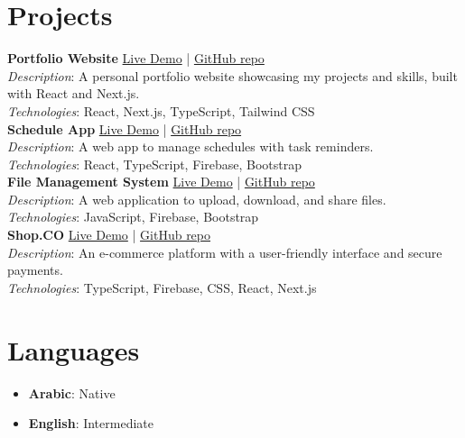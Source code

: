 \documentclass[a4paper,12pt]{article}
\begin{document}
\section*{Projects}
\textbf{Portfolio Website} \hfill 
\href{https://portfolio-ahmedraouanes-projects.vercel.app/}{Live Demo} | 
\href{https://github.com/ahmedRAOUANE/Portfolio}{GitHub repo}\\
\textit{Description}: A personal portfolio website showcasing my projects and skills, built with React and Next.js.\\
\textit{Technologies}: React, Next.js, TypeScript, Tailwind CSS\\[0.8em]

\textbf{Schedule App} \hfill 
\href{https://schedule-app-blue.vercel.app/ar}{Live Demo} | 
\href{https://github.com/ahmedRAOUANE/schedule-app}{GitHub repo}\\
\textit{Description}: A web app to manage schedules with task reminders.\\
\textit{Technologies}: React, TypeScript, Firebase, Bootstrap\\[0.8em]

\textbf{File Management System} \hfill 
\href{https://ahmedraouane.github.io/file-management-system/}{Live Demo} | 
\href{https://github.com/ahmedRAOUANE/file-management-system}{GitHub repo}\\
\textit{Description}: A web application to upload, download, and share files.\\
\textit{Technologies}: JavaScript, Firebase, Bootstrap\\[0.8em]

\textbf{Shop.CO} \hfill 
\href{https://shop-co-virid-two.vercel.app/}{Live Demo} | 
\href{https://github.com/ahmedRAOUANE/Shop.CO}{GitHub repo}\\
\textit{Description}: An e-commerce platform with a user-friendly interface and secure payments.\\
\textit{Technologies}: TypeScript, Firebase, CSS, React, Next.js

\section*{Languages}
\begin{itemize}[noitemsep]
    \item \textbf{Arabic}: Native
    \item \textbf{English}: Intermediate
\end{itemize}
\end{document}

